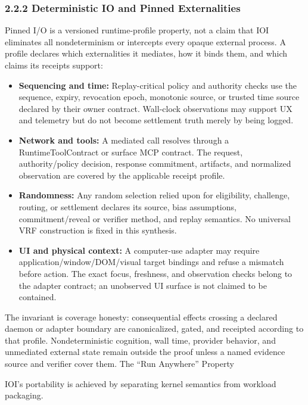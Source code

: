 \documentclass[
  11pt,
]{article}
\providecommand{\tightlist}{%
  \setlength{\itemsep}{0pt}\setlength{\parskip}{0pt}}
\begin{document}
\hypertarget{deterministic-io-and-pinned-externalities}{%
\subsubsection{2.2.2 Deterministic IO and Pinned
Externalities}\label{deterministic-io-and-pinned-externalities}}

Pinned I/O is a versioned runtime-profile property, not a claim that IOI
eliminates all nondeterminism or intercepts every opaque external process. A
profile declares which externalities it mediates, how it binds them, and which
claims its receipts support:

\begin{itemize}
\tightlist
\item
  \textbf{Sequencing and time:} Replay-critical policy and authority checks use
  the sequence, expiry, revocation epoch, monotonic source, or trusted time
  source declared by their owner contract. Wall-clock observations may support
  UX and telemetry but do not become settlement truth merely by being logged.
\item
  \textbf{Network and tools:} A mediated call resolves through a
  RuntimeToolContract or surface MCP contract. The request, authority/policy
  decision, response commitment, artifacts, and normalized observation are
  covered by the applicable receipt profile.
\item
  \textbf{Randomness:} Any random selection relied upon for eligibility,
  challenge, routing, or settlement declares its source, bias assumptions,
  commitment/reveal or verifier method, and replay semantics. No universal VRF
  construction is fixed in this synthesis.
\item
  \textbf{UI and physical context:} A computer-use adapter may require
  application/window/DOM/visual target bindings and refuse a mismatch before
  action. The exact focus, freshness, and observation checks belong to the
  adapter contract; an unobserved UI surface is not claimed to be contained.
\end{itemize}

The invariant is coverage honesty: consequential effects crossing a declared
daemon or adapter boundary are canonicalized, gated, and receipted according
to that profile. Nondeterministic cognition, wall time, provider behavior, and
unmediated external state remain outside the proof unless a named evidence
source and verifier cover them.
The ``Run Anywhere'' Property

IOI's portability is achieved by separating kernel semantics from
workload packaging.
\end{document}
